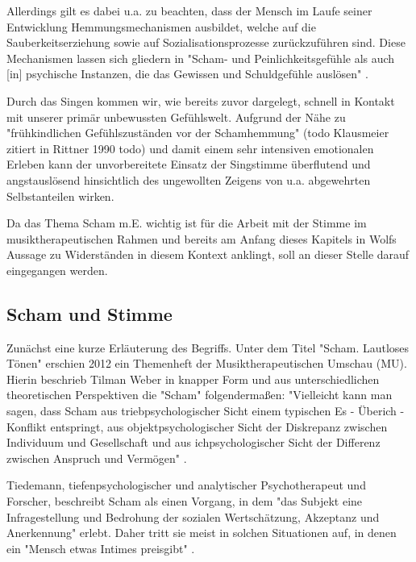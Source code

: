 Allerdings gilt es dabei u.a. zu beachten, dass der Mensch im Laufe seiner Entwicklung Hemmungsmechanismen ausbildet, welche auf die Sauberkeitserziehung sowie auf Sozialisationsprozesse zurückzuführen sind. Diese Mechanismen lassen sich gliedern in "Scham- und Peinlichkeitsgefühle als auch [in] psychische Instanzen, die das Gewissen und Schuldgefühle auslösen" \autocite [106f.]{rittner1990}. 

Durch das Singen kommen wir, wie bereits zuvor dargelegt, schnell in Kontakt mit unserer primär unbewussten Gefühlswelt. Aufgrund der Nähe zu "frühkindlichen Gefühlszuständen vor der Schamhemmung" (todo Klausmeier zitiert in Rittner 1990 todo) und damit einem sehr intensiven emotionalen Erleben kann der unvorbereitete Einsatz der Singstimme überflutend und angstauslösend hinsichtlich des ungewollten Zeigens von u.a. abgewehrten Selbstanteilen wirken. 

Da das Thema Scham m.E. wichtig ist für die Arbeit mit der Stimme im musiktherapeutischen Rahmen und bereits am Anfang dieses Kapitels in Wolfs Aussage zu Widerständen in diesem Kontext anklingt, soll an dieser Stelle darauf eingegangen werden.

\subsection{Scham und Stimme}
Zunächst eine kurze Erläuterung des Begriffs. Unter dem Titel "Scham. Lautloses Tönen" erschien 2012 ein Themenheft der Musiktherapeutischen Umschau (MU). Hierin beschrieb Tilman Weber in knapper Form und aus unterschiedlichen theoretischen Perspektiven die "Scham" folgendermaßen:
"Vielleicht kann man sagen, dass Scham aus triebpsychologischer Sicht einem typischen Es - Überich - Konflikt entspringt, aus objektpsychologischer Sicht der Diskrepanz zwischen Individuum und Gesellschaft und aus ichpsychologischer Sicht der Differenz zwischen Anspruch und Vermögen" \autocite[215]{weber2012}. 

Tiedemann, tiefenpsychologischer und analytischer Psychotherapeut und Forscher, beschreibt Scham als einen Vorgang, in dem "das Subjekt eine Infragestellung und Bedrohung der sozialen Wertschätzung, Akzeptanz und Anerkennung" \autocite[219]{tiedemann2012} erlebt. Daher tritt sie meist in solchen Situationen auf, in denen ein "Mensch etwas Intimes preisgibt" \autocite[219]{tiedemann2012}. 


